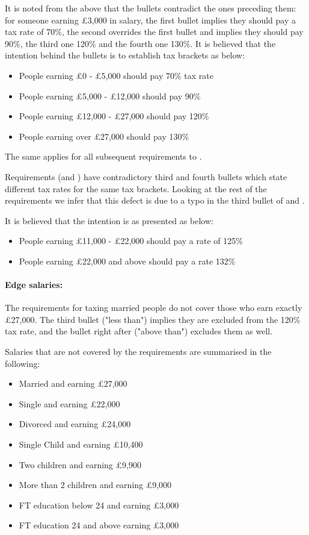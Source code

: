 It is noted from the above that the bullets contradict the ones preceding them: for someone earning £3,000 in salary, the first bullet implies they should pay a tax rate of 70\%, the second overrides the first bullet and implies they should pay 90\%, the third one 120\% and the fourth one 130\%. It is believed that the intention behind the bullets is to establish tax brackets as below: 
\begin{itemize}
	\item People earning £0 - £5,000 should pay 70\% tax rate 
	\item People earning £5,000 - £12,000 should pay 90\%
	\item People earning £12,000 - £27,000 should pay 120\%
	\item People earning over £27,000 should pay 130\%
\end{itemize}
The same applies for all subsequent requirements \REightSix \space to \REightTwelve. 

Requirements (\REightSix \space and \REightSeven) have contradictory third and fourth bullets which state different tax rates for the same tax brackets. Looking at the rest of the requirements we infer that this defect is due to a typo in the third bullet of \REightSix \space and \REightSeven. 

It is believed that the intention is as presented as below: 
\begin{itemize}
	\item People earning £11,000 - £22,000 should pay a rate of 125\%
	\item People earning £22,000 and above should pay a rate 132\%
\end{itemize}

\paragraph{Edge salaries:}
The requirements for taxing married people do not cover those who earn exactly £27,000. The third bullet ("less than") implies they are excluded from the 120\% tax rate, and the bullet right after ("above than") excludes them as well. 
\par
Salaries that are not covered by the requirements are summarised in the following:
\begin{itemize}
	\item Married and earning £27,000
	\item Single and earning £22,000
	\item Divorced and earning £24,000
	\item Single Child and earning £10,400
	\item Two children and earning £9,900
	\item More than 2 children and earning £9,000
	\item FT education below 24 and earning £3,000
	\item FT education 24 and above earning £3,000
\end{itemize}

